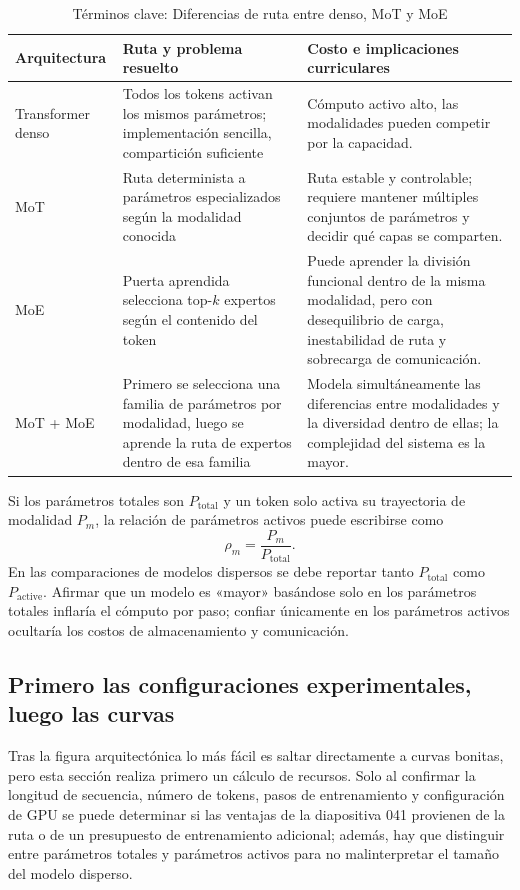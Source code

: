 \begin{table}[H]
\centering
\small
\begin{tabularx}{0.98\textwidth}{L{0.17\textwidth}Y Y}
\toprule
Arquitectura & Ruta y problema resuelto & Costo e implicaciones curriculares \\
\midrule
Transformer denso & Todos los tokens activan los mismos parámetros; implementación sencilla, compartición suficiente & Cómputo activo alto, las modalidades pueden competir por la capacidad. \\
MoT & Ruta determinista a parámetros especializados según la modalidad conocida & Ruta estable y controlable; requiere mantener múltiples conjuntos de parámetros y decidir qué capas se comparten. \\
MoE & Puerta aprendida selecciona top-$k$ expertos según el contenido del token & Puede aprender la división funcional dentro de la misma modalidad, pero con desequilibrio de carga, inestabilidad de ruta y sobrecarga de comunicación. \\
MoT + MoE & Primero se selecciona una familia de parámetros por modalidad, luego se aprende la ruta de expertos dentro de esa familia & Modela simultáneamente las diferencias entre modalidades y la diversidad dentro de ellas; la complejidad del sistema es la mayor. \\
\bottomrule
\end{tabularx}
\caption{Términos clave: Diferencias de ruta entre denso, MoT y MoE}
\end{table}

Si los parámetros totales son $P_{\text{total}}$ y un token solo activa su trayectoria de modalidad $P_{m}$, la relación de parámetros activos puede escribirse como
$$
\rho_m=\frac{P_m}{P_{\text{total}}}.
$$
En las comparaciones de modelos dispersos se debe reportar tanto $P_{\text{total}}$ como $P_{\text{active}}$. Afirmar que un modelo es «mayor» basándose solo en los parámetros totales inflaría el cómputo por paso; confiar únicamente en los parámetros activos ocultaría los costos de almacenamiento y comunicación.

\subsection{Primero las configuraciones experimentales, luego las curvas}

Tras la figura arquitectónica lo más fácil es saltar directamente a curvas bonitas, pero esta sección realiza primero un cálculo de recursos. Solo al confirmar la longitud de secuencia, número de tokens, pasos de entrenamiento y configuración de GPU se puede determinar si las ventajas de la diapositiva 041 provienen de la ruta o de un presupuesto de entrenamiento adicional; además, hay que distinguir entre parámetros totales y parámetros activos para no malinterpretar el tamaño del modelo disperso.

